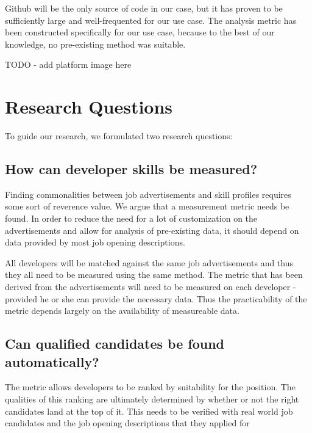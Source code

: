 Github will be the only source of code in our case, but it has proven to be sufficiently large and well-frequented for our use case. The analysis metric has been constructed specifically for our use case, because to the best of our knowledge, no pre-existing method was suitable.

TODO - add platform image here

\section{Research Questions}\label{sec:research-questions}
To guide our research, we formulated two research questions:

\subsection{How can developer skills be measured?}\label{subsec:dev-skill-measurement}
Finding commonalities between job advertisements and skill profiles
requires some sort of reverence value. We argue that a measurement
metric needs be found.
In order to reduce the need for a lot of customization
on the advertisements and allow for  analysis of pre-existing data,
it should depend on data provided by most job opening descriptions.
\newline

All developers will be matched against the same job advertisements
and thus they all need to be measured using the same method.
The metric that has been derived from the advertisements will need to be
measured on each developer - provided he or she can provide the
necessary data. Thus the practicability of the metric depends largely on
the availability of measureable data.

\subsection{Can qualified candidates be found automatically?}\label{subsec:measurement-quality}
The metric allows developers to be ranked by suitability for the position.
The qualities of this ranking are ultimately determined by whether
or not the right candidates land at the top of it. This needs to be
verified with real world job candidates and the job opening descriptions
that they applied for

